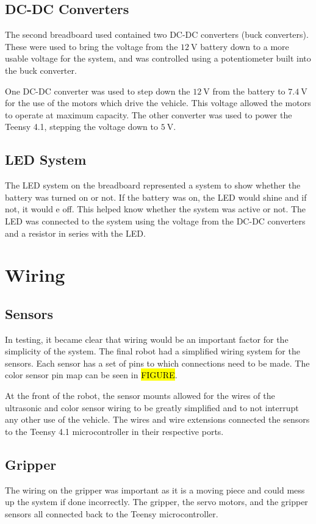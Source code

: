\documentclass[11pt]{report}
\begin{document}
\subsection{DC-DC Converters}
The second breadboard used contained two \gls{DC}-\gls{DC} converters (buck converters). These were used to bring the voltage from the $\SI{12}{\volt}$ battery down to a more usable voltage for the system, and was controlled using a potentiometer built into the buck converter. 
\par One DC-DC converter was used to step down the $\SI{12}{\volt}$ from the battery to $\SI{7.4}{\volt}$ for the use of the motors which drive the vehicle. This voltage allowed the motors to operate at maximum capacity. The other converter was used to power the Teensy 4.1, stepping the voltage down to $\SI{5}{\volt}$. 
\subsection{LED System}
The \gls{LED} system on the breadboard represented a system to show whether the battery was turned on or not. If the battery was on, the \gls{LED} would shine and if not, it would e off. This helped know whether the system was active or not. The \gls{LED} was connected to the system using the voltage from the \gls{DC}-\gls{DC} converters and a resistor in series with the \gls{LED}. 
\section{Wiring}
\subsection{Sensors}
In testing, it became clear that wiring would be an important factor for the simplicity of the system. The final robot had a simplified wiring system for the sensors. Each sensor has a set of pins to which connections need to be made. The color sensor pin map can be seen in \hl{FIGURE}. 
\par At the front of the robot, the sensor mounts allowed for the wires of the ultrasonic and color sensor wiring to be greatly simplified and to not interrupt any other use of the vehicle. The wires and wire extensions connected the sensors to the Teensy 4.1 microcontroller in their respective ports.
\subsection{Gripper}
The wiring on the gripper was important as it is a moving piece and could mess up the system if done incorrectly. The gripper, the servo motors, and the gripper sensors all connected back to the Teensy microcontroller. 
\end{document}
